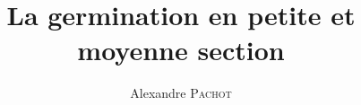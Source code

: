 \title{La germination en petite et moyenne section}
\author{Alexandre \textsc{Pachot}}
\date{}
\maketitle
